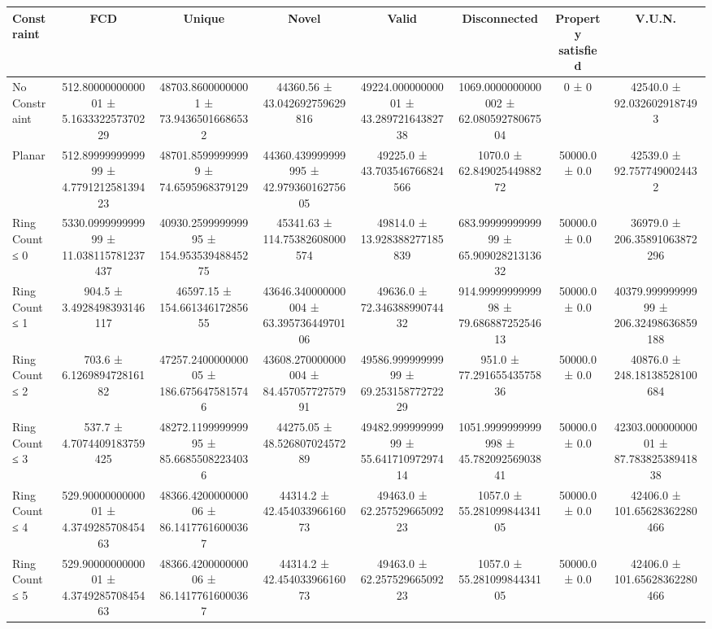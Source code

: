 \begin{table}[H]
    \centering
    \begin{tabular}{l c c c c c c c}
        \toprule
        \textbf{Constraint} & \textbf{FCD} & \textbf{Unique} & \textbf{Novel} & \textbf{Valid} & \textbf{Disconnected} & \textbf{Property satisfied} & \textbf{V.U.N.} \\
        \midrule
        No Constraint & 512.8000000000001 ± 5.163332257370229 & 48703.86000000001 ± 73.94365016686532 & 44360.56 ± 43.042692759629816 & 49224.00000000001 ± 43.28972164382738 & 1069.0000000000002 ± 62.08059278067504 & 0 ± 0 & 42540.0 ± 92.0326029187493 \\
        Planar & 512.8999999999999 ± 4.779121258139423 & 48701.85999999999 ± 74.6595968379129 & 44360.439999999995 ± 42.97936016275605 & 49225.0 ± 43.703546766824566 & 1070.0 ± 62.84902544988272 & 50000.0 ± 0.0 & 42539.0 ± 92.7577490024432 \\
        Ring Count ≤ 0 & 5330.099999999999 ± 11.038115781237437 & 40930.259999999995 ± 154.95353948845275 & 45341.63 ± 114.75382608000574 & 49814.0 ± 13.928388277185839 & 683.9999999999999 ± 65.90902821313632 & 50000.0 ± 0.0 & 36979.0 ± 206.35891063872296 \\
        Ring Count ≤ 1 & 904.5 ± 3.4928498393146117 & 46597.15 ± 154.66134617285655 & 43646.340000000004 ± 63.39573644970106 & 49636.0 ± 72.34638899074432 & 914.9999999999998 ± 79.68688725254613 & 50000.0 ± 0.0 & 40379.99999999999 ± 206.32498636859188 \\
        Ring Count ≤ 2 & 703.6 ± 6.126989472816182 & 47257.240000000005 ± 186.6756475815746 & 43608.270000000004 ± 84.45705772757991 & 49586.99999999999 ± 69.25315877272229 & 951.0 ± 77.29165543575836 & 50000.0 ± 0.0 & 40876.0 ± 248.18138528100684 \\
        Ring Count ≤ 3 & 537.7 ± 4.7074409183759425 & 48272.119999999995 ± 85.66855082234036 & 44275.05 ± 48.52680702457289 & 49482.99999999999 ± 55.64171097297414 & 1051.9999999999998 ± 45.78209256903841 & 50000.0 ± 0.0 & 42303.00000000001 ± 87.78382538941838 \\
        Ring Count ≤ 4 & 529.9000000000001 ± 4.374928570845463 & 48366.420000000006 ± 86.14177616000367 & 44314.2 ± 42.45403396616073 & 49463.0 ± 62.25752966509223 & 1057.0 ± 55.28109984434105 & 50000.0 ± 0.0 & 42406.0 ± 101.65628362280466 \\
        Ring Count ≤ 5 & 529.9000000000001 ± 4.374928570845463 & 48366.420000000006 ± 86.14177616000367 & 44314.2 ± 42.45403396616073 & 49463.0 ± 62.25752966509223 & 1057.0 ± 55.28109984434105 & 50000.0 ± 0.0 & 42406.0 ± 101.65628362280466 \\

\end{tabular}
\end{table}
